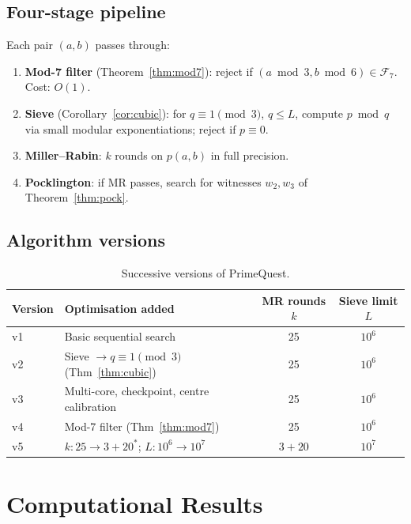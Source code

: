 \documentclass[11pt,a4paper]{article}
\theoremstyle{plain}
\theoremstyle{definition}
\begin{document}
\subsection{Four-stage pipeline}

Each pair $(a, b)$ passes through:
\begin{enumerate}[leftmargin=*]
\item \textbf{Mod-7 filter} (Theorem~\ref{thm:mod7}): reject if
$(a \bmod 3, b \bmod 6) \in \mathcal{F}_7$. Cost: $O(1)$.
\item \textbf{Sieve} (Corollary~\ref{cor:cubic}): for $q \equiv 1 \pmod{3}$,
$q \le L$, compute $p \bmod q$ via small modular exponentiations; reject if
$p \equiv 0$.
\item \textbf{Miller--Rabin}: $k$ rounds on $p(a, b)$ in full precision.
\item \textbf{Pocklington}: if MR passes, search for witnesses $w_2, w_3$ of
Theorem~\ref{thm:pock}.
\end{enumerate}

\subsection{Algorithm versions}

\begin{table}[ht]
\centering
\caption{Successive versions of PrimeQuest.}
\label{tab:versions}
\begin{tabular}{l l c c}
\toprule
Version & Optimisation added & MR rounds $k$ & Sieve limit $L$ \\
\midrule
v1 & Basic sequential search                       & 25       & $10^6$ \\
v2 & Sieve $\to q \equiv 1 \pmod{3}$ (Thm~\ref{thm:cubic}) & 25       & $10^6$ \\
v3 & Multi-core, checkpoint, centre calibration    & 25       & $10^6$ \\
v4 & Mod-7 filter (Thm~\ref{thm:mod7})             & 25       & $10^6$ \\
v5 & $k: 25 \to 3 + 20^*$; $L: 10^6 \to 10^7$      & $3 + 20$ & $10^7$ \\
\bottomrule
\end{tabular}
\end{table}

\section{Computational Results}
\label{sec:results}
\end{document}
